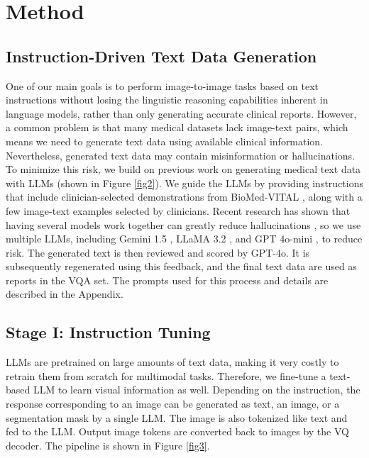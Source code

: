 

\section{Method}
\subsection{Instruction-Driven Text Data Generation}
\label{sec3.1}
One of our main goals is to perform image-to-image tasks based on text instructions without losing the linguistic reasoning capabilities inherent in language models, rather than only generating accurate clinical reports. However, a common problem is that many medical datasets lack image-text pairs, which means we need to generate text data using available clinical information. Nevertheless, generated text data may contain misinformation or hallucinations. To minimize this risk, we build on previous work on generating medical text data with LLMs (shown in Figure \ref{fig2}). We guide the LLMs by providing instructions that include clinician-selected demonstrations from BioMed-VITAL \cite{cui2024biomedical}, along with a few image-text examples selected by clinicians. Recent research has shown that having several models work together can greatly reduce hallucinations \cite{du2023improving}, so we use multiple LLMs, including Gemini 1.5 \cite{team2023gemini}, LLaMA 3.2 \cite{grattafiori2024llama3herdmodels}, and GPT 4o-mini \cite{achiam2023gpt}, to reduce risk. The generated text is then reviewed and scored by GPT-4o. It is subsequently regenerated using this feedback, and the final text data are used as reports in the VQA set. The prompts used for this process and details are described in the Appendix.

\subsection{Stage I: Instruction Tuning}
LLMs are pretrained on large amounts of text data, making it very costly to retrain them from scratch for multimodal tasks. Therefore, we fine-tune a text-based LLM to learn visual information as well. Depending on the instruction, the response corresponding to an image can be generated as text, an image, or a segmentation mask by a single LLM. The image is also tokenized like text and fed to the LLM. Output image tokens are converted back to images by the VQ decoder. The pipeline is shown in Figure \ref{fig3}.

